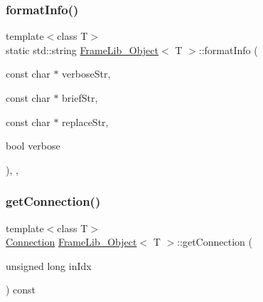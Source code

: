 \subsubsection{\texorpdfstring{format\+Info()}{formatInfo()}\hspace{0.1cm}{\footnotesize\ttfamily [5/5]}}
{\footnotesize\ttfamily template$<$class T$>$ \\
static std\+::string \hyperlink{class_frame_lib___object}{Frame\+Lib\+\_\+\+Object}$<$ T $>$\+::format\+Info (\begin{DoxyParamCaption}\item[{const char $\ast$}]{verbose\+Str,  }\item[{const char $\ast$}]{brief\+Str,  }\item[{const char $\ast$}]{replace\+Str,  }\item[{bool}]{verbose }\end{DoxyParamCaption})\hspace{0.3cm}{\ttfamily [inline]}, {\ttfamily [static]}, {\ttfamily [protected]}}

\mbox{\label{class_frame_lib___object_a87d56a68ea04f515206adb616b233048}} 
\subsubsection{\texorpdfstring{get\+Connection()}{getConnection()}}
{\footnotesize\ttfamily template$<$class T$>$ \\
\hyperlink{struct_frame_lib___object_1_1_connection}{Connection} \hyperlink{class_frame_lib___object}{Frame\+Lib\+\_\+\+Object}$<$ T $>$\+::get\+Connection (\begin{DoxyParamCaption}\item[{unsigned long}]{in\+Idx }\end{DoxyParamCaption}) const\hspace{0.3cm}{\ttfamily [inline]}}

\mbox{\label{class_frame_lib___object_acd33f63f6755575ad4eebabe6b7e2aaa}} 
